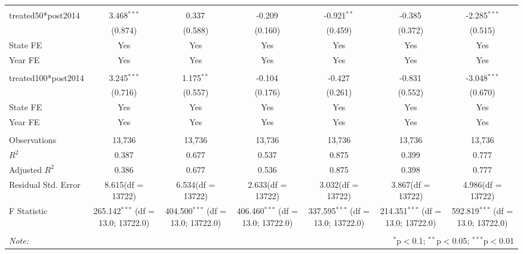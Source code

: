 \documentclass[12pt]{article}
\begin{document}
\begin{table}[!htbp]
\begin{tabular}{@{\extracolsep{5pt}}lcccccc}
\hline \\[-1.8ex]
 treated50*post2014 & 3.468$^{***}$ & 0.337$^{}$ & -0.209$^{}$ & -0.921$^{**}$ & -0.385$^{}$ & -2.285$^{***}$ \\
  & (0.874) & (0.588) & (0.160) & (0.459) & (0.372) & (0.515) \\
 State FE & Yes & Yes & Yes & Yes & Yes & Yes \\
 Year FE & Yes & Yes & Yes & Yes & Yes & Yes \\
\hline \\[-1.8ex]
 treated100*post2014 & 3.245$^{***}$ & 1.175$^{**}$ & -0.104$^{}$ & -0.427$^{}$ & -0.831$^{}$ & -3.048$^{***}$ \\
  & (0.716) & (0.557) & (0.176) & (0.261) & (0.552) & (0.670) \\
 State FE & Yes & Yes & Yes & Yes & Yes & Yes \\
 Year FE & Yes & Yes & Yes & Yes & Yes & Yes \\
\hline \\[-1.8ex]
 Observations & 13,736 & 13,736 & 13,736 & 13,736 & 13,736 & 13,736 \\
 $R^2$ & 0.387 & 0.677 & 0.537 & 0.875 & 0.399 & 0.777 \\
 Adjusted $R^2$ & 0.386 & 0.677 & 0.536 & 0.875 & 0.398 & 0.777 \\
 Residual Std. Error & 8.615(df = 13722) & 6.534(df = 13722) & 2.633(df = 13722) & 3.032(df = 13722) & 3.867(df = 13722) & 4.986(df = 13722)  \\
 F Statistic & 265.142$^{***}$ (df = 13.0; 13722.0) & 404.500$^{***}$ (df = 13.0; 13722.0) & 406.460$^{***}$ (df = 13.0; 13722.0) & 337.595$^{***}$ (df = 13.0; 13722.0) & 214.351$^{***}$ (df = 13.0; 13722.0) & 592.819$^{***}$ (df = 13.0; 13722.0) \\
\hline
\hline \\[-1.8ex]
\textit{Note:} & \multicolumn{6}{r}{$^{*}$p$<$0.1; $^{**}$p$<$0.05; $^{***}$p$<$0.01} \\
\end{tabular}
\end{table}
\end{document}
